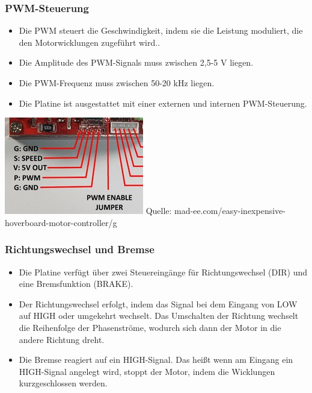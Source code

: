 \documentclass[ngerman,12pt,a4paper]{article}
\begin{document}
		\subsubsection*{PWM-Steuerung}
		\begin{itemize}
			\item Die PWM steuert die Geschwindigkeit, indem sie die Leistung moduliert, die den Motorwicklungen zugeführt wird..
			\item Die Amplitude des PWM-Signals muss zwischen 2,5-5 V liegen.
			\item Die PWM-Frequenz muss zwischen 50-20 kHz liegen.
			\item Die Platine ist ausgestattet mit einer externen und internen PWM-Steuerung.
		\end{itemize}
		
		\begin{center}
			\begin{minipage}{\textwidth}
				\centering
				\includegraphics[scale=1]{Pictures/PWM-Treiber}
				\label{fig:spiffs_init}
				\vspace{-2pt}
				\small Quelle: mad-ee.com/easy-inexpensive-hoverboard-motor-controller/g
			\end{minipage}
		\end{center}
		\newpage
		\subsubsection*{Richtungswechsel und Bremse}
		\begin{itemize}
			\item Die Platine verfügt über zwei Steuereingänge für Richtungswechsel (DIR) und eine Bremsfunktion (BRAKE).
			\item Der Richtungswechsel erfolgt, indem das Signal bei dem Eingang von LOW auf HIGH oder umgekehrt wechselt. Das Umschalten der Richtung wechselt die Reihenfolge der Phasenströme, wodurch sich dann der Motor in die andere Richtung dreht.
			\item Die Bremse reagiert auf ein HIGH-Signal. Das heißt wenn am Eingang ein HIGH-Signal angelegt wird, stoppt der Motor, indem die Wicklungen kurzgeschlossen werden.
		\end{itemize}
		
\end{document}
